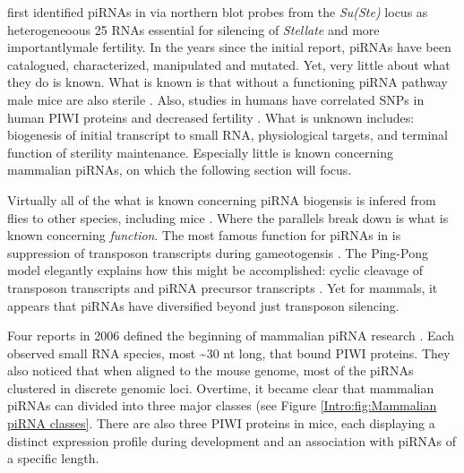 {    \citet{Aravin2001} first identified piRNAs in \flies{} via northern blot probes from the \textit{Su(Ste)} locus as heterogeneoous 25 RNAs essential for silencing of \textit{Stellate} and more importantly\textendash male fertility. In the years since the initial report, piRNAs have been catalogued, characterized, manipulated and mutated. Yet, very little about what they do is known. What is known is that without a functioning piRNA pathway male mice are also sterile \citep{Deng2002c,Kuramochi-Miyagawa2004}. Also, studies in humans have correlated SNPs in human PIWI proteins and decreased fertility \citep{Gu2010a}. What is unknown includes: biogenesis of initial transcript to small RNA, physiological targets, and terminal function of sterility maintenance. Especially little is known concerning mammalian piRNAs, on which the following section will focus.

    Virtually all of the what is known concerning piRNA biogensis is infered from flies to other species, including mice \citep{Siomi2011,Luteijn2013,Hirose2014}. Where the parallels break down is what is known concerning \textit{function}. The most famous function for piRNAs in \flies{} is suppression of transposon transcripts during gameotogensis \citep{Malone2009}. The Ping-Pong model elegantly explains how this might be accomplished: cyclic cleavage of transposon transcripts and piRNA precursor transcripts \citep{Brennecke2007,Gunawardane2007}. Yet for mammals, it appears that piRNAs have diversified beyond just transposon silencing.

    Four reports in 2006 defined the beginning of mammalian piRNA research \citep{Aravin2006,Grivna2006,Girard2006,Lau2006}. Each observed small RNA species, most \textasciitilde30 nt long, that bound PIWI proteins. They also noticed that when aligned to the mouse genome, most of the piRNAs clustered in discrete genomic loci. Overtime, it became clear that mammalian piRNAs can divided into three major classes (see Figure \ref{Intro:fig:Mammalian piRNA classes}. There are also three PIWI proteins in mice, each displaying a distinct expression profile during development and an association with piRNAs of a specific length. 

}
